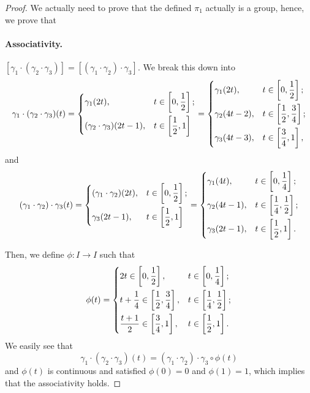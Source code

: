 \begin{proof}
	We actually need to prove that the defined \(\pi _1\) actually is a group, hence, we prove that
	\paragraph{Associativity.} \([\gamma_{1}\cdot (\gamma_2\cdot \gamma_3)] = [(\gamma_1\cdot \gamma_2)\cdot \gamma_3]\). We break this down into
	\[
		\gamma_1\cdot(\gamma_2\cdot \gamma_3)(t) = \begin{dcases}
			\gamma_{1}(2t ),                 & t\in\left[0, \frac{1}{2}\right]; \\
			(\gamma_2\cdot \gamma_3)(2t-1) , & t\in\left[\frac{1}{2}, 1\right]
		\end{dcases} = \begin{dcases}
			\gamma_{1}(2t ), & t\in\left[0, \frac{1}{2}\right];           \\
			\gamma_2(4t-2) , & t\in\left[\frac{1}{2}, \frac{3}{4}\right]; \\
			\gamma_3(4t-3) , & t\in\left[\frac{3}{4}, 1\right],
		\end{dcases}
	\]
	and
	\[
		(\gamma_1\cdot\gamma_2)\cdot \gamma_3(t) = \begin{dcases}
			(\gamma_{1}\cdot \gamma_2) (2t ), & t\in\left[0, \frac{1}{2}\right]; \\
			\gamma_3(2t-1) ,                  & t\in\left[\frac{1}{2}, 1\right]
		\end{dcases} = \begin{dcases}
			\gamma_{1}(4t),  & t\in\left[0, \frac{1}{4}\right];           \\
			\gamma_2(4t-1) , & t\in\left[\frac{1}{4}, \frac{1}{2}\right]; \\
			\gamma_3(2t-1) , & t\in\left[\frac{1}{2}, 1\right].
		\end{dcases}
	\]

	\par Then, we define \(\phi \colon I\to I\) such that
	\[
		\phi (t) = \begin{dcases}
			2t\in\left[0, \frac{1}{2}\right],                      & t\in\left[0, \frac{1}{4}\right];           \\
			t+\frac{1}{4}\in\left[\frac{1}{2}, \frac{3}{4}\right], & t\in\left[\frac{1}{4}, \frac{1}{2}\right]; \\
			\frac{t+1}{2}\in\left[\frac{3}{4}, 1\right],           & t\in\left[\frac{1}{2}, 1\right].
		\end{dcases}
	\]
	We easily see that
	\[
		\gamma_1\cdot(\gamma_2\cdot \gamma_3)(t) = (\gamma_1\cdot\gamma_2)\cdot \gamma_{3}\circ \phi (t)
	\]
	and \(\phi (t)\) is continuous and satisfied \(\phi (0) = 0\) and \(\phi (1) = 1\), which implies that the associativity holds.


\end{proof}
